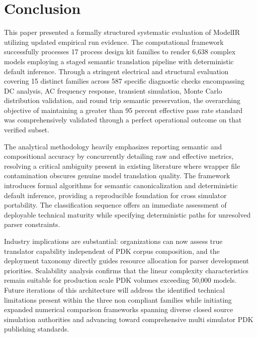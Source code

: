 \documentclass[10pt,twocolumn]{article}
\begin{document}
\section{Conclusion}
This paper presented a formally structured systematic evaluation of ModelIR utilizing updated empirical run evidence. The computational framework successfully processes 17 process design kit families to render 6,638 complex models employing a staged semantic translation pipeline with deterministic default inference. Through a stringent electrical and structural evaluation covering 15 distinct families across 587 specific diagnostic checks encompassing DC analysis, AC frequency response, transient simulation, Monte Carlo distribution validation, and round trip semantic preservation, the overarching objective of maintaining a greater than 95 percent effective pass rate standard was comprehensively validated through a perfect operational outcome on that verified subset. 

The analytical methodology heavily emphasizes reporting semantic and compositional accuracy by concurrently detailing raw and effective metrics, resolving a critical ambiguity present in existing literature where wrapper file contamination obscures genuine model translation quality. The framework introduces formal algorithms for semantic canonicalization and deterministic default inference, providing a reproducible foundation for cross simulator portability. The classification sequence offers an immediate assessment of deployable technical maturity while specifying deterministic paths for unresolved parser constraints. 

Industry implications are substantial: organizations can now assess true translator capability independent of PDK corpus composition, and the deployment taxonomy directly guides resource allocation for parser development priorities. Scalability analysis confirms that the linear complexity characteristics remain suitable for production scale PDK volumes exceeding 50,000 models. Future iterations of this architecture will address the identified technical limitations present within the three non compliant families while initiating expanded numerical comparison frameworks spanning diverse closed source simulation authorities and advancing toward comprehensive multi simulator PDK publishing standards.
\end{document}
